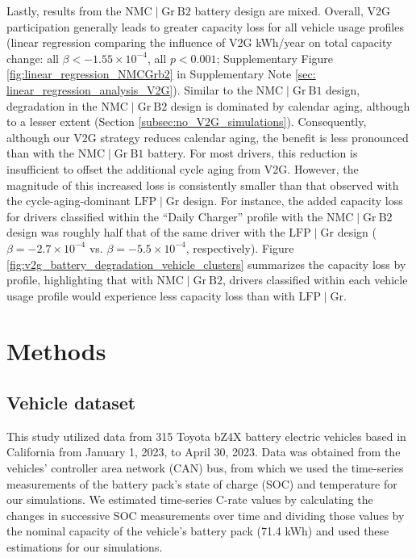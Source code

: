 \documentclass[pdflatex,sn-nature]{sn-jnl}%
\theoremstyle{thmstyleone}%
\theoremstyle{thmstyletwo}%
\theoremstyle{thmstylethree}%
\begin{document}
Lastly, results from the $\mathrm{NMC}\mid\mathrm{Gr~B2}$ battery design are mixed. Overall, V2G participation generally leads to greater capacity loss for all vehicle usage profiles (linear regression comparing the influence of V2G kWh/year on total capacity change: all $\beta < -1.55 \times 10^{-4}$, all $p < 0.001$; Supplementary Figure \ref{fig:linear_regression_NMCGrb2} in Supplementary Note \ref{sec: linear_regression_analysis_V2G}). Similar to the $\mathrm{NMC}\mid\mathrm{Gr~B1}$ design, degradation in the $\mathrm{NMC}\mid\mathrm{Gr~B2}$ design is dominated by calendar aging, although to a lesser extent (Section \ref{subsec:no_V2G_simulations}). Consequently, although our V2G strategy reduces calendar aging, the benefit is less pronounced than with the $\mathrm{NMC}\mid\mathrm{Gr~B1}$ battery. For most drivers, this reduction is insufficient to offset the additional cycle aging from V2G. However, the magnitude of this increased loss is consistently smaller than that observed with the cycle-aging-dominant $\mathrm{LFP}\mid\mathrm{Gr}$ design. For instance, the added capacity loss for drivers classified within the ``Daily Charger'' profile with the $\mathrm{NMC}\mid\mathrm{Gr~B2}$ design was roughly half that of the same driver with the $\mathrm{LFP}\mid\mathrm{Gr}$ design ($\beta = -2.7 \times 10^{-4}$ vs. $\beta = -5.5 \times 10^{-4}$, respectively). Figure \ref{fig:v2g_battery_degradation_vehicle_clusters} summarizes the capacity loss by profile, highlighting that with $\mathrm{NMC}\mid\mathrm{Gr~B2}$, drivers classified within each vehicle usage profile would experience less capacity loss than with $\mathrm{LFP}\mid\mathrm{Gr}$.





\section{Methods}
\subsection{Vehicle dataset}
\label{subsec:vehicle_dataset}

This study utilized data from 315 Toyota bZ4X battery electric vehicles based in California from January 1, 2023, to April 30, 2023. Data was obtained from the vehicles’ controller area network (CAN) bus, from which we used the time-series measurements of the battery pack’s state of charge (SOC) and temperature for our simulations. We estimated time-series C-rate values by calculating the changes in successive SOC measurements over time and dividing those values by the nominal capacity of the vehicle’s battery pack (71.4 kWh) and used these estimations for our simulations. 
\end{document}
